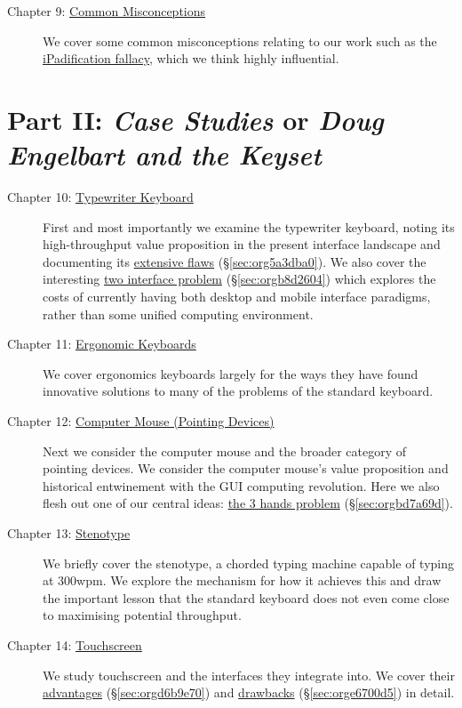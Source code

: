 \documentclass[logo,bsc,singlespacing,parskip]{infthesis}
\begin{document}
\begin{description}
\begin{description}
\item[{Chapter 9: \hyperref[sec:orgdf8952a]{Common Misconceptions}}] We cover some common misconceptions relating to our work such as the \hyperref[ipadification fallacy]{iPadification fallacy}, which we think highly influential.
\end{description}
\end{description}

\section*{Part II: \emph{Case Studies} or \emph{Doug Engelbart and the Keyset}}
\label{sec:org394da15}
\begin{description}
\item[{Chapter 10: \hyperref[sec:orgd7e18d8]{Typewriter Keyboard}}] First and most importantly we examine the typewriter keyboard, noting its high-throughput value proposition in the present interface landscape and documenting its \hyperref[sec:org5a3dba0]{extensive flaws} (\S \ref{sec:org5a3dba0}).
We also cover the interesting \hyperref[sec:orgb8d2604]{two interface problem} (\S \ref{sec:orgb8d2604}) which explores the costs of currently having both desktop and mobile interface paradigms, rather than some unified computing environment.

\item[{Chapter 11: \hyperref[sec:org2de285b]{Ergonomic Keyboards}}] We cover ergonomics keyboards largely for the ways they have found innovative solutions to many of the problems of the standard keyboard.

\item[{Chapter 12: \hyperref[sec:orgbf9479d]{Computer Mouse (Pointing Devices)}}] Next we consider the computer mouse and the broader category of pointing devices.
We consider the computer mouse's value proposition and historical entwinement with the GUI computing revolution.
Here we also flesh out one of our central ideas: \hyperref[sec:orgbd7a69d]{the 3 hands problem} (\S \ref{sec:orgbd7a69d}).

\item[{Chapter 13: \hyperref[sec:org7fa5628]{Stenotype} }] We briefly cover the stenotype, a chorded typing machine capable of typing at 300wpm.
We explore the mechanism for how it achieves this and draw the important lesson that the standard keyboard does not even come close to maximising potential throughput.

\item[{Chapter 14:  \hyperref[sec:org1df47d2]{Touchscreen}}] We study touchscreen and the interfaces they integrate into.
We cover their \hyperref[sec:orgd6b9e70]{advantages} (\S \ref{sec:orgd6b9e70}) and \hyperref[sec:orge6700d5]{drawbacks} (\S \ref{sec:orge6700d5}) in detail.


\end{description}
\end{document}
